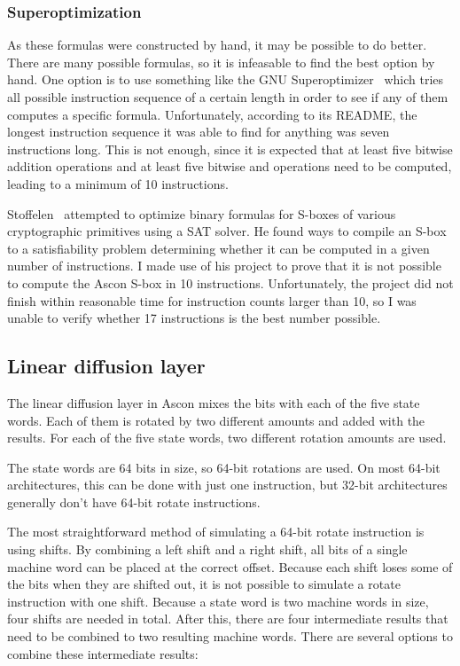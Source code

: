 \subsubsection{Superoptimization}

As these formulas were constructed by hand, it may be possible to do better.
There are many possible formulas, so it is infeasable to find the best option by
hand. One option is to use something like the GNU
Superoptimizer~\cite{superoptimizer} which tries all possible instruction
sequence of a certain length in order to see if any of them computes a specific
formula. Unfortunately, according to its README, the longest instruction
sequence it was able to find for anything was seven instructions long. This is
not enough, since it is expected that at least five bitwise addition operations
and at least five bitwise and operations need to be computed, leading to a
minimum of 10 instructions.

Stoffelen~\cite{sat} attempted to optimize binary formulas for S-boxes of
various cryptographic primitives using a SAT solver. He found ways to compile an
S-box to a satisfiability problem determining whether it can be computed in a
given number of instructions. I made use of his project to prove that it is not
possible to compute the Ascon S-box in 10 instructions. Unfortunately, the
project did not finish within reasonable time for instruction counts larger than
10, so I was unable to verify whether 17 instructions is the best number
possible.

\subsection{Linear diffusion layer}

The linear diffusion layer in Ascon mixes the bits with each of the five state
words. Each of them is rotated by two different amounts and added with the
results. For each of the five state words, two different rotation amounts are
used.

The state words are 64 bits in size, so 64-bit rotations are used. On most
64-bit architectures, this can be done with just one instruction, but 32-bit
architectures generally don't have 64-bit rotate instructions.

The most straightforward method of simulating a 64-bit rotate instruction is
using shifts. By combining a left shift and a right shift, all bits of a single
machine word can be placed at the correct offset. Because each shift loses some
of the bits when they are shifted out, it is not possible to simulate a rotate
instruction with one shift. Because a state word is two machine words in size,
four shifts are needed in total. After this, there are four intermediate results
that need to be combined to two resulting machine words. There are several
options to combine these intermediate results:

